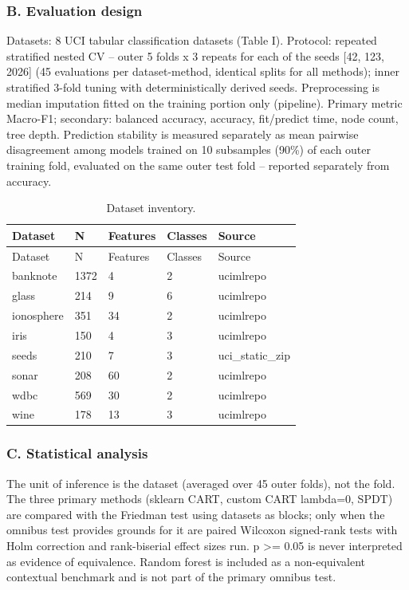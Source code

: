 \documentclass[
  conference]{IEEEtran}
\begin{document}
\subsubsection{B. Evaluation design}\label{b.-evaluation-design}

Datasets: 8 UCI tabular classification datasets (Table I). Protocol:
repeated stratified nested CV -- outer 5 folds x 3 repeats for each of
the seeds {[}42, 123, 2026{]} (45 evaluations per dataset-method,
identical splits for all methods); inner stratified 3-fold tuning with
deterministically derived seeds. Preprocessing is median imputation
fitted on the training portion only (pipeline). Primary metric Macro-F1;
secondary: balanced accuracy, accuracy, fit/predict time, node count,
tree depth. Prediction stability is measured separately as mean pairwise
disagreement among models trained on 10 subsamples (90\%) of each outer
training fold, evaluated on the same outer test fold -- reported
separately from accuracy.

\begin{longtable}[]{@{}lllll@{}}
\caption{Dataset inventory.}\tabularnewline
\toprule\noalign{}
Dataset & N & Features & Classes & Source \\
\midrule\noalign{}
\endfirsthead
\toprule\noalign{}
Dataset & N & Features & Classes & Source \\
\midrule\noalign{}
\endhead
\bottomrule\noalign{}
\endlastfoot
banknote & 1372 & 4 & 2 & ucimlrepo \\
glass & 214 & 9 & 6 & ucimlrepo \\
ionosphere & 351 & 34 & 2 & ucimlrepo \\
iris & 150 & 4 & 3 & ucimlrepo \\
seeds & 210 & 7 & 3 & uci\_static\_zip \\
sonar & 208 & 60 & 2 & ucimlrepo \\
wdbc & 569 & 30 & 2 & ucimlrepo \\
wine & 178 & 13 & 3 & ucimlrepo \\
\end{longtable}

\subsubsection{C. Statistical analysis}\label{c.-statistical-analysis}

The unit of inference is the dataset (averaged over 45 outer folds), not
the fold. The three primary methods (sklearn CART, custom CART lambda=0,
SPDT) are compared with the Friedman test using datasets as blocks; only
when the omnibus test provides grounds for it are paired Wilcoxon
signed-rank tests with Holm correction and rank-biserial effect sizes
run. p \textgreater= 0.05 is never interpreted as evidence of
equivalence. Random forest is included as a non-equivalent contextual
benchmark and is not part of the primary omnibus test.
\end{document}
